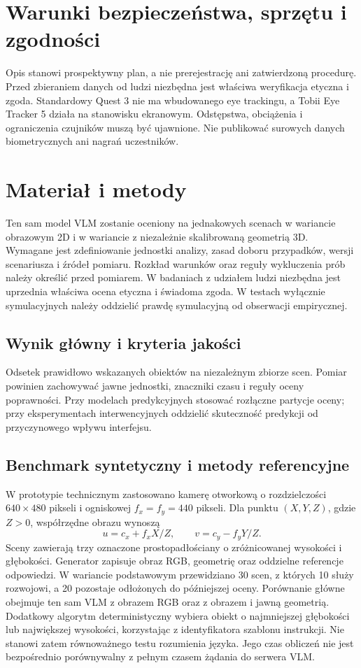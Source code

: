 \documentclass[11pt,a4paper]{article}
\begin{document}
\section{Warunki bezpieczeństwa, sprzętu i zgodności}
Opis stanowi prospektywny plan, a nie prerejestrację ani zatwierdzoną procedurę. Przed zbieraniem danych od ludzi niezbędna jest właściwa weryfikacja etyczna i zgoda. Standardowy Quest 3 nie ma wbudowanego eye trackingu, a Tobii Eye Tracker 5 działa na stanowisku ekranowym. Odstępstwa, obciążenia i ograniczenia czujników muszą być ujawnione. Nie publikować surowych danych biometrycznych ani nagrań uczestników.

\section{Materiał i metody}

Ten sam model VLM zostanie oceniony na jednakowych scenach w wariancie obrazowym 2D i w wariancie z niezależnie skalibrowaną geometrią 3D. Wymagane jest zdefiniowanie jednostki analizy, zasad doboru przypadków, wersji scenariusza i źródeł pomiaru. Rozkład warunków oraz reguły wykluczenia prób należy określić przed pomiarem. W badaniach z udziałem ludzi niezbędna jest uprzednia właściwa ocena etyczna i świadoma zgoda. W testach wyłącznie symulacyjnych należy oddzielić prawdę symulacyjną od obserwacji empirycznej.

\subsection{Wynik główny i kryteria jakości}

Odsetek prawidłowo wskazanych obiektów na niezależnym zbiorze scen. Pomiar powinien zachowywać jawne jednostki, znaczniki czasu i reguły oceny poprawności. Przy modelach predykcyjnych stosować rozłączne partycje oceny; przy eksperymentach interwencyjnych oddzielić skuteczność predykcji od przyczynowego wpływu interfejsu.


\subsection{Benchmark syntetyczny i metody referencyjne}
W prototypie technicznym zastosowano kamerę otworkową o rozdzielczości
$640\times480$ pikseli i ogniskowej $f_x=f_y=440$ pikseli.
Dla punktu $(X,Y,Z)$, gdzie $Z>0$, współrzędne obrazu wynoszą
\[
 u=c_x+f_x X/Z,\qquad v=c_y-f_y Y/Z.
\]
Sceny zawierają trzy oznaczone prostopadłościany o zróżnicowanej wysokości
i głębokości. Generator zapisuje obraz RGB, geometrię oraz oddzielne
referencje odpowiedzi. W wariancie podstawowym przewidziano 30 scen,
z których 10 służy rozwojowi, a 20 pozostaje odłożonych do późniejszej oceny.
Porównanie główne obejmuje ten sam VLM z obrazem RGB oraz z obrazem
i jawną geometrią. Dodatkowy algorytm deterministyczny wybiera obiekt
o najmniejszej głębokości lub największej wysokości, korzystając z identyfikatora
szablonu instrukcji. Nie stanowi zatem równoważnego testu rozumienia języka.
Jego czas obliczeń nie jest bezpośrednio porównywalny z pełnym czasem
żądania do serwera VLM.
\end{document}
